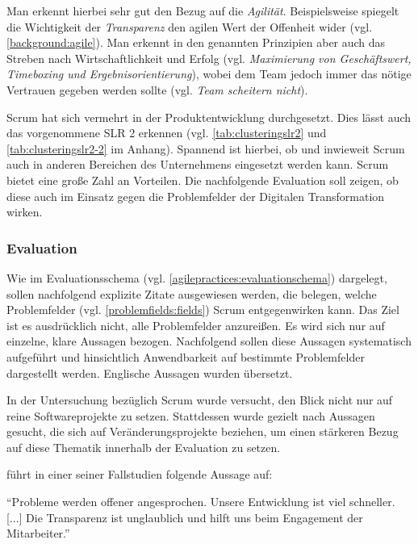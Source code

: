 Man erkennt hierbei sehr gut den Bezug auf die \textit{Agilität}. Beispielsweise spiegelt die Wichtigkeit der \textit{Transparenz} den agilen Wert der Offenheit wider (vgl. \ref{background:agile}). Man erkennt in den genannten Prinzipien aber auch das Streben nach Wirtschaftlichkeit und Erfolg (vgl. \textit{Maximierung von Geschäftswert, Timeboxing und Ergebnisorientierung}), wobei dem Team jedoch immer das nötige Vertrauen gegeben werden sollte (vgl. \textit{Team scheitern nicht}).

Scrum hat sich vermehrt in der Produktentwicklung durchgesetzt. Dies lässt auch das vorgenommene SLR 2 erkennen (vgl. \ref{tab:clusteringslr2} und \ref{tab:clusteringslr2-2} im Anhang). Spannend ist hierbei, ob und inwieweit Scrum auch in anderen Bereichen des Unternehmens eingesetzt werden kann. Scrum bietet eine große Zahl an Vorteilen. Die nachfolgende Evaluation soll zeigen, ob diese auch im Einsatz gegen die Problemfelder der Digitalen Transformation wirken.

\subsubsection{Evaluation}

Wie im Evaluationsschema (vgl. \ref{agilepractices:evaluationschema}) dargelegt, sollen nachfolgend explizite Zitate ausgewiesen werden, die belegen, welche  Problemfelder (vgl. \ref{problemfields:fields}) Scrum entgegenwirken kann. Das Ziel ist es ausdrücklich nicht, alle Problemfelder anzureißen. Es wird sich nur auf einzelne, klare Aussagen bezogen. Nachfolgend sollen diese Aussagen systematisch aufgeführt und hinsichtlich Anwendbarkeit auf bestimmte Problemfelder dargestellt werden. Englische Aussagen wurden übersetzt.

In der Untersuchung bezüglich Scrum wurde versucht, den Blick nicht nur auf reine Softwareprojekte zu setzen. Stattdessen wurde gezielt nach Aussagen gesucht, die sich auf Veränderungsprojekte beziehen, um einen stärkeren Bezug auf diese Thematik innerhalb der Evaluation zu setzen. 



 führt in einer seiner Fallstudien folgende Aussage auf:

\begin{center}
	``Probleme werden offener angesprochen. Unsere Entwicklung ist viel schneller. [...] Die Transparenz ist unglaublich und hilft uns beim Engagement der Mitarbeiter.'' \cite[S. 5]{fuchs_adapting_2019}
\end{center}

